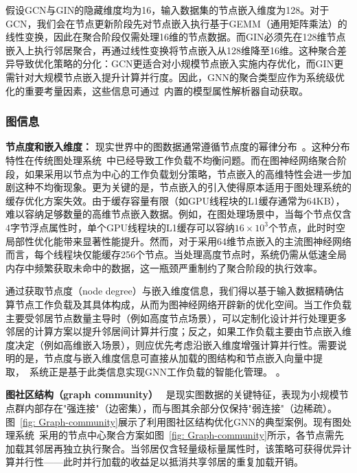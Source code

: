 假设GCN与GIN的隐藏维度均为16，输入数据集的节点嵌入维度为128。对于GCN，我们会在节点更新阶段先对节点嵌入执行基于GEMM（通用矩阵乘法）的线性变换，因此在聚合阶段仅需处理16维的节点数据。而GIN必须先在128维节点嵌入上执行邻居聚合，再通过线性变换将节点嵌入从128维降至16维。这种聚合差异导致优化策略的分化：GCN更适合对小规模节点嵌入实施内存优化，而GIN更需针对大规模节点嵌入提升计算并行度。因此，GNN的聚合类型应作为系统级优化的重要考量因素，这些信息可通过~\Mname{}内置的模型属性解析器自动获取。
\subsubsection{图信息}
\label{sect: Graph Information}
\textbf{节点度和嵌入维度：}
现实世界中的图数据通常遵循节点度的幂律分布~\cite{graph-power-law}。这种分布特性在传统图处理系统~\cite{liu2015enterprise, Mizan, han2014experimental}中已经导致工作负载不均衡问题。而在图神经网络聚合阶段，如果采用以节点为中心的工作负载划分策略，节点嵌入的高维特性会进一步加剧这种不均衡现象。更为关键的是，节点嵌入的引入使得原本适用于图处理系统的缓存优化方案失效。由于缓存容量有限（如GPU线程块的L1缓存通常为64KB），难以容纳足够数量的高维节点嵌入数据。例如，在图处理场景中，当每个节点仅含4字节浮点属性时，单个GPU线程块的L1缓存可以容纳$16\times10^3$个节点，此时时空局部性优化能带来显著性能提升。然而，对于采用64维节点嵌入的主流图神经网络而言，每个线程块仅能缓存256个节点。当处理高度节点时，系统仍需从低速全局内存中频繁获取未命中的数据，这一瓶颈严重制约了聚合阶段的执行效率。

通过获取节点度（node degree）与嵌入维度信息，我们得以基于输入数据精确估算节点工作负载及其具体构成，从而为图神经网络开辟新的优化空间。当工作负载主要受邻居节点数量主导时（例如高度节点场景），可以定制化设计并行处理更多邻居的计算方案以提升邻居间计算并行度；反之，如果工作负载主要由节点嵌入维度决定（例如高维嵌入场景），则应优先考虑沿嵌入维度增强计算并行性。需要说明的是，节点度与嵌入维度信息可直接从加载的图结构和节点嵌入向量中提取，~\Mname{}系统正是基于此类信息实现GNN工作负载的智能化管理。
。  

\textbf{图社区结构（graph community）}
~\cite{fortunato2010community, lancichinetti2008benchmark, newman2013spectral}是现实图数据的关键特征，表现为小规模节点群内部存在"强连接"（边密集），而与图其余部分仅保持"弱连接"（边稀疏）。图~\ref{fig: Graph-community}展示了利用图社区结构优化GNN的典型案例。现有图处理系统~\cite{wang2016gunrock, khorasani2014cusha}采用的节点中心聚合方案如图~\ref{fig: Graph-community}所示，各节点需先加载其邻居再独立执行聚合。当邻居仅含轻量级标量属性时，该策略可获得优异计算并行性——此时并行加载的收益足以抵消共享邻居的重复加载开销。

